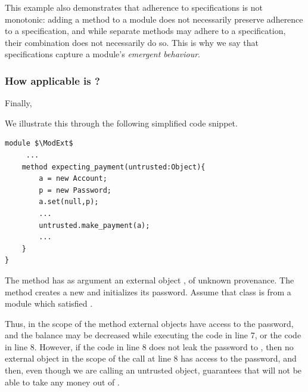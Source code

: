  This example also demonstrates that 
adherence to   \Nec specifications is not monotonic:
adding a method to a module does not necessarily preserve adherence to
a specification, 
and while separate methods may adhere to a  specification, their combination does
not necessarily do so. 
This is why we say that \Nec   specifications capture a module's \emph{emergent behaviour}. 
 

\subsubsection{How applicable is  \SrobustB?}
\label{sec:how}
Finally, 

 
We illustrate this through the following simplified code snippet.
 

\begin{lstlisting}[mathescape=true, language=chainmail, frame=lines]
module $\ModExt$
     ...
    method expecting_payment(untrusted:Object){ 
        a = new Account;
        p = new Password; 
        a.set(null,p);
        ...
        untrusted.make_payment(a);
        ...
    }
}
\end{lstlisting}
 

 The method  has as  argument an external object , of unknown provenance.
The method  creates a new  and initializes its password. 
Assume that class  is from a module which satisfied \SrobustB. 

 Thus, 
in the scope of the method  external objects have access to the password, 
and the balance may be decreased 
while executing the code in line 7, or the code in line 8. 
However, if the code in line 8 does not leak the password to , then no external object
in  the scope of the call  at line 8 has access to the password, and then,
even though we are calling   an untrusted object, \SrobustB guarantees that 
 will not be able to take any money out of  .
 
